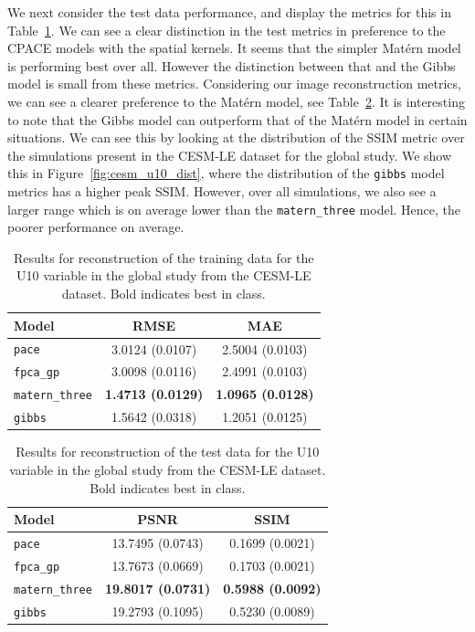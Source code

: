 We next consider the test data performance, and display the metrics for this in Table~\ref{tab:test_cesm_u10_globe}.
We can see a clear distinction in the test metrics in preference to the CPACE models with the spatial kernels.
It seems that the simpler Mat\'ern model is performing best over all.
However the distinction between that and the Gibbs model is small from these metrics.
Considering our image reconstruction metrics, we can see a clearer preference to the Mat\'ern model, see Table~\ref{tab:full_cesm_u10_globe}. 
It is interesting to note that the Gibbs model can outperform that of the Mat\'ern model in certain situations.
We can see this by looking at the distribution of the SSIM metric over the simulations present in the CESM-LE dataset for the global study.
We show this in Figure~\ref{fig:cesm_u10_dist}, where the distribution of the \verb*|gibbs| model metrics has a higher peak SSIM. 
However, over all simulations, we also see a larger range which is on average lower than the \verb*|matern_three| model. 
Hence, the poorer performance on average.


\begin{table}
	\caption[Results for the U10 variable on test data in the Global study.]{Results for reconstruction of the training data for the U10 variable in the global study from the CESM-LE dataset. Bold indicates best in class.}
	\centering
	\label{tab:test_cesm_u10_globe}
	\begin{tabular}{lcc}
		\toprule
		\textbf{Model} & \textbf{RMSE} & \textbf{MAE} \\
		\midrule
		\verb*|pace| & 3.0124 (0.0107) & 2.5004	(0.0103) \\
		\verb*|fpca_gp| & 3.0098 (0.0116) & 2.4991 (0.0103) \\
		\verb*|matern_three| & \textbf{1.4713 (0.0129)}& \textbf{1.0965	(0.0128)}\\
		\verb*|gibbs| & 1.5642	(0.0318) & 1.2051	(0.0125)\\
		\bottomrule
	\end{tabular}
\end{table}

\begin{table}
	\caption[Results for the U10 variable on training data in the Global study.]{Results for reconstruction of the test data for the U10 variable in the global study from the CESM-LE dataset. Bold indicates best in class.}
	\centering
	\label{tab:full_cesm_u10_globe}
	\begin{tabular}{lcc}
		\toprule
		\textbf{Model} & \textbf{PSNR} & \textbf{SSIM} \\
		\midrule
		\verb*|pace| & 13.7495	(0.0743) & 0.1699 (0.0021) \\
		\verb*|fpca_gp| & 13.7673 (0.0669)& 0.1703 (0.0021) \\
		\verb*|matern_three| & \textbf{19.8017 (0.0731)}& \textbf{0.5988 (0.0092)}\\
		\verb*|gibbs| & 19.2793	(0.1095) & 0.5230 (0.0089)\\
		\bottomrule
	\end{tabular}
\end{table}

